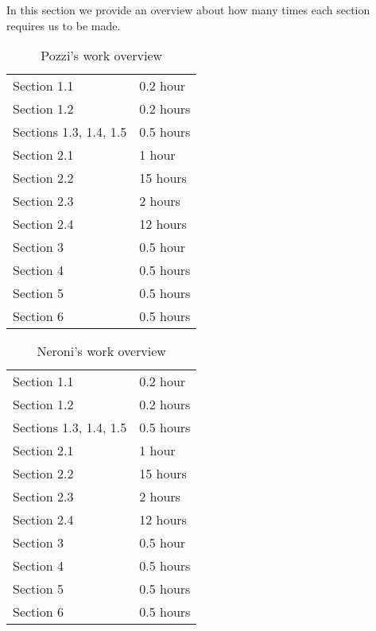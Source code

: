 In this section we provide an overview about how many times each section requires us to be made.


\begin{table} [H]
\centering
{}
{\centering
\begin{tabular}{m{2.5in}|m{.9in}}
Section 1.1 & 0.2 hour\\
Section 1.2 & 0.2 hours\\
Sections 1.3, 1.4, 1.5 & 0.5 hours\\
Section 2.1 & 1 hour\\
Section 2.2 & 15 hours\\
Section 2.3 & 2 hours\\
Section 2.4 & 12 hours\\
Section 3 & 0.5 hour\\
Section 4 & 0.5 hours\\
Section 5 & 0.5 hours\\
Section 6 & 0.5 hours\\
\end{tabular}
}
\caption{Pozzi's work overview}
\end{table}


\begin{table} [H]
\centering
{}
{\centering
\begin{tabular}{m{2.5in}|m{.9in}}
Section 1.1 & 0.2 hour\\
Section 1.2 & 0.2 hours\\
Sections 1.3, 1.4, 1.5 & 0.5 hours\\
Section 2.1 & 1 hour\\
Section 2.2 & 15 hours\\
Section 2.3 & 2 hours\\
Section 2.4 & 12 hours\\
Section 3 & 0.5 hour\\
Section 4 & 0.5 hours\\
Section 5 & 0.5 hours\\
Section 6 & 0.5 hours\\
\end{tabular}
}
\caption{Neroni's work overview}
\end{table}



